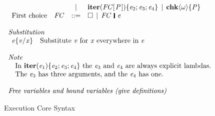 \begin{figure}[t]
$$\begin{array}{l}
\begin{array}{lrcl}
                       &     & \vb & \ensuremath{\textbf{iter}(\Conid{FC} [\mskip1.5mu \Conid{P}\mskip1.5mu])\{\Varid{e}_{\mathrm{2}};\Varid{e}_{\mathrm{3}};\Varid{e}_{\mathrm{4}}\}} \vb \ensuremath{{\bf chk}\langle\omega\rangle\{\Conid{P}\}} \\
\text{First choice} & \ensuremath{\Conid{FC}} & ::= & \ensuremath{\hole} \vb \ensuremath{\Conid{FC}\hspace{0.19em}\mathop{\rule[-0.1em]{0.15em}{0.75em}}\hspace{0.2em}\Varid{e}} \\
\end{array} \\
\\

\mbox{\em Substitution} \\
\begin{array}{ll}
  \ensuremath{\Varid{e}\{\Varid{v}/\Varid{x}\}} & \text{Substitute \ensuremath{\Varid{v}} for \ensuremath{\Varid{x}} everywhere in \ensuremath{\Varid{e}}} \\
\end{array}
\\ \\
\mbox{\em Note}\\
\hspace{1em} \text{In \ensuremath{\textbf{iter}(\Varid{e}_{\mathrm{1}})\{\Varid{e}_{\mathrm{2}};\Varid{e}_{\mathrm{3}};\Varid{e}_{\mathrm{4}}\}} the \ensuremath{\Varid{e}_{\mathrm{3}}} and \ensuremath{\Varid{e}_{\mathrm{4}}} are always explicit lambdas.}\\
\hspace{1em} \text{The \ensuremath{\Varid{e}_{\mathrm{3}}} has three arguments, and the \ensuremath{\Varid{e}_{\mathrm{4}}} has one.}
\\ \\
\mbox{\em Free variables and bound variables (give definitions)} \\
\end{array}
     $$
  \caption{Execution Core Syntax} \label{fig:vc-syntax}
\end{figure}

